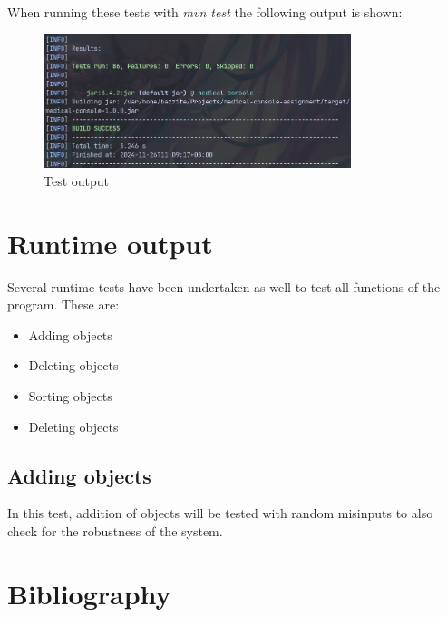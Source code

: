 \documentclass{article}
\begin{document}
	When running these tests with \textit{mvn test} the following output is shown:
	\begin{figure}
		\begin{center}
			\includegraphics[width=0.8\textwidth]{figures/Mvn_test.png}
		\end{center}
		\caption{Test output}\label{fig:}
	\end{figure}
	

	\section{Runtime output}\label{sec:runtime_output} %
	Several runtime tests have been undertaken as well to test all functions of the program. These are:
	\begin{itemize}
		\item Adding objects
		\item Deleting objects 
		\item Sorting objects 
		\item Deleting objects
	\end{itemize}

	\subsection{Adding objects}\label{sub:adding_objects} %
	In this test, addition of objects will be tested with random misinputs to also check for the robustness of the system.


	

	\section{Bibliography}\label{sec:bibliography} %
	\printbibliography
\end{document}
